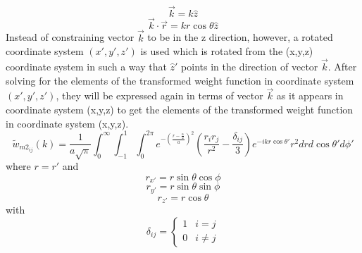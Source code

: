 \documentclass[double,12pt]{beavtex}
\begin{document}
\begin{equation}{\vec{k}=k\hat{z}}\end{equation}
\begin{equation}{\vec{k}\cdot\vec{r}=kr\cos\theta\hat{z}}\end{equation}
Instead of constraining vector $\vec{k}$ to be in the z direction, however, a rotated coordinate system $(x',y',z')$ is used which is rotated from the (x,y,z) coordinate system in such a way that $\hat{z}'$ points in the direction of vector $\vec{k}$. After solving for the elements of the transformed weight function in coordinate system $(x',y',z')$, they will be expressed again in terms of vector $\vec{k}$ as it appears in coordinate system (x,y,z) to get the elements of the transformed weight function in coordinate system (x,y,z).%
\begin{equation}{\widetilde{w}_{m2_{ij}}(k)=\frac{1}{a\sqrt{\pi}}\int_{0}^{\infty}\int_{-1}^{1}\int_{0}^{2\pi}e^{-\left(\frac{r-\frac{\alpha}{2}}{a}\right)^2}\left(\frac{r_ir_j}{r^2}-\frac{\delta_{ij}}{3}\right)e^{-ikr\cos\theta'}r^2d{r}d{\cos\theta'}d{\phi'}}\end{equation}
where $r=r'$ and
\begin{displaymath}{r_{x'}=r\sin\theta\cos\phi}\end{displaymath}
\begin{displaymath}{r_{y'}=r\sin\theta\sin\phi}\end{displaymath}
\begin{displaymath}{r_{z'}=r\cos\theta}\end{displaymath} 
with
\begin{displaymath}{\delta_{ij}=\left\{ \begin{array}{rc} 1 & i = j \\ 0  & i\neq j \end{array}\right.}\end{displaymath}
\end{document}
